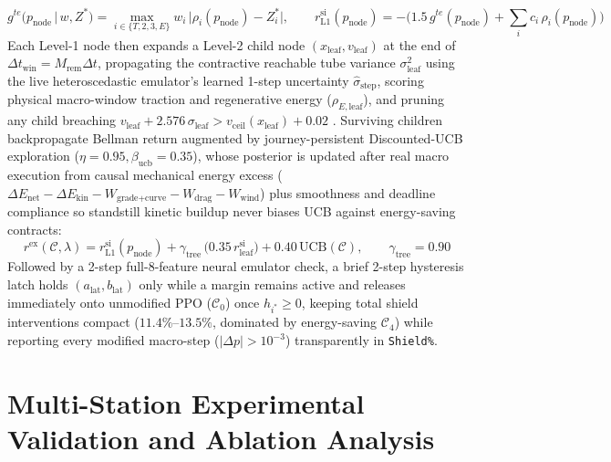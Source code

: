 \documentclass[10pt,a4paper]{article}
\begin{document}
\begin{enumerate}
    \begin{equation}
    g^{te}\big(p_{\text{node}} \,\big|\, w, Z^*\big) = \max_{i \in \{T, 2, 3, E\}} w_i\,\big|\rho_i(p_{\text{node}}) - Z_i^*\big|, \qquad r^{\text{si}}_{\text{L1}}(p_{\text{node}}) = -\Big(1.5\,g^{te}(p_{\text{node}}) + \sum_{i} c_i\,\rho_i(p_{\text{node}})\Big)
    \label{eq:tchebycheff}
    \end{equation}
    Each Level-1 node then expands a Level-2 child node $(x_{\text{leaf}}, v_{\text{leaf}})$ at the end of $\Delta t_{\text{win}} = M_{\text{rem}}\Delta t$, propagating the contractive reachable tube variance $\sigma_{\text{leaf}}^2$ using the live heteroscedastic emulator's learned 1-step uncertainty $\hat{\sigma}_{\text{step}}$, scoring physical macro-window traction and regenerative energy ($\rho_{E,\text{leaf}}$), and pruning any child breaching $v_{\text{leaf}} + 2.576\,\sigma_{\text{leaf}} > v_{\text{ceil}}(x_{\text{leaf}}) + 0.02$ \cite{ref18}. Surviving children backpropagate Bellman return augmented by journey-persistent Discounted-UCB exploration ($\eta = 0.95, \beta_{\text{ucb}} = 0.35$), whose posterior is updated after real macro execution from causal mechanical energy excess ($\Delta E_{\text{net}} - \Delta E_{\text{kin}} - W_{\text{grade+curve}} - W_{\text{drag}} - W_{\text{wind}}$) plus smoothness and deadline compliance so standstill kinetic buildup never biases UCB against energy-saving contracts:
    \begin{equation}
    r^{\text{ex}}(\mathcal{C}, \lambda) = r^{\text{si}}_{\text{L1}}(p_{\text{node}}) + \gamma_{\text{tree}}\,\big(0.35\,r^{\text{si}}_{\text{leaf}}\big) + 0.40\,\text{UCB}(\mathcal{C}), \qquad \gamma_{\text{tree}} = 0.90
    \label{eq:tree_bellman}
    \end{equation}
    Followed by a 2-step full-8-feature neural emulator check, a brief 2-step hysteresis latch holds $(a_{\text{lat}}, b_{\text{lat}})$ only while a margin remains active and releases immediately onto unmodified PPO ($\mathcal{C}_0$) once $h_{i^*} \ge 0$, keeping total shield interventions compact ($11.4\%\text{--}13.5\%$, dominated by energy-saving $\mathcal{C}_4$) while reporting every modified macro-step ($|\Delta p| > 10^{-3}$) transparently in \texttt{Shield\%}.
\end{enumerate}

\section{Multi-Station Experimental Validation and Ablation Analysis}
\label{sec:validation}
\end{document}
